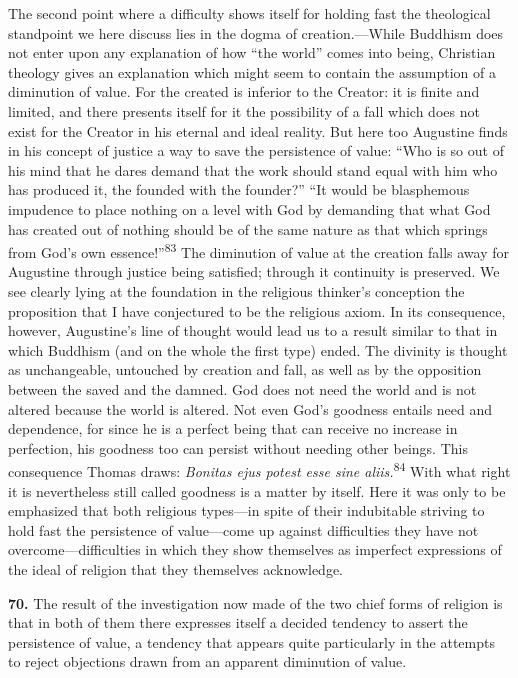 \documentclass[12pt,a4paper]{book}
\newcommand{\opage}[1]{\marginnote{\footnotesize\textit{[#1]}}}
\begin{document}
The second point where a difficulty shows itself for holding fast the theological standpoint we here
discuss lies in the dogma of creation.---While Buddhism does not enter upon any explanation of how
``the world'' comes into being, Christian theology gives an explanation which might seem to contain
the assumption of a diminution of value. For the created is inferior to the Creator: it is finite and
limited, and there presents itself for it the possibility of a fall which does not exist for the
Creator in his eternal and ideal reality. But here too Augustine finds in his concept of justice a way
to save the persistence of value: ``Who is so out of his mind that he dares demand that the work
should stand equal with him who has produced it, the founded with the founder?'' ``It would be
blasphemous impudence to place nothing on a level with God by demanding that what God has created out
of nothing should be of the same nature as that which springs from God's own
essence!''\textsuperscript{83} The diminution of value at the creation falls away for Augustine
through justice being satisfied; through it continuity is preserved. We see clearly lying at the
foundation in the religious thinker's conception the proposition that I have conjectured to be the
religious axiom. In its consequence, however, Augustine's line of thought would lead us to a result
similar to that in which Buddhism (and 
\opage{163}on the whole the first type) ended. The divinity is thought as
unchangeable, untouched by creation and fall, as well as by the opposition between the saved and the
damned. God does not need the world and is not altered because the world is altered. Not even God's
goodness entails need and dependence, for since he is a perfect being that can receive no increase in
perfection, his goodness too can persist without needing other beings. This consequence Thomas draws:
\textit{Bonitas ejus potest esse sine aliis.}\textsuperscript{84} With what right it is nevertheless
still called goodness is a matter by itself. Here it was only to be emphasized that both religious
types---in spite of their indubitable striving to hold fast the persistence of value---come up against
difficulties they have not overcome---difficulties in which they show themselves as imperfect
expressions of the ideal of religion that they themselves acknowledge.

\medskip

\noindent\textbf{70.} The result of the investigation now made of the two chief forms of
religion is that in both of them there expresses itself a decided tendency to assert the
persistence of value, a tendency that appears quite particularly in the attempts to reject
objections drawn from an apparent diminution of value.
\end{document}
